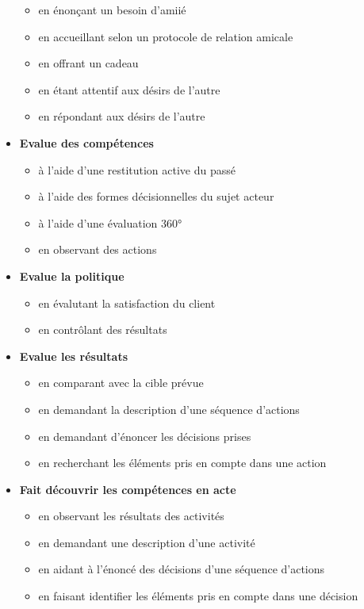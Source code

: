 \documentclass[8pt,a4paper]{article}
\begin{document}
\begin{itemize}
\begin{itemize}
\item en énonçant un besoin d'amiié  
\item en accueillant selon un protocole de relation amicale
\item en offrant un cadeau
\item en étant attentif aux désirs de l'autre
\item en répondant aux désirs de l'autre
\\ 
 \end{itemize}
\item \textbf{Evalue des compétences}
\begin{itemize}
\item à l'aide d'une restitution active du passé
\item à l'aide des formes décisionnelles du sujet acteur
\item à l'aide d'une évaluation 360°
\item en observant des actions
\\ 
 \end{itemize}
\item \textbf{Evalue la politique}
\begin{itemize}
\item en évalutant la satisfaction du client
\item en contrôlant des résultats
\\ 
 \end{itemize}
\item \textbf{Evalue les résultats}
\begin{itemize}
\item en comparant avec la cible prévue
\item en demandant la description d'une séquence d'actions
\item en demandant d'énoncer les décisions prises  
\item en recherchant les éléments pris en compte dans une action
\\ 
 \end{itemize}
\item \textbf{Fait découvrir les compétences en acte}
\begin{itemize}
\item en observant les résultats des activités
\item en demandant une description d'une activité
\item en aidant à l'énoncé des décisions d'une séquence d'actions
\item en faisant identifier les éléments pris en compte dans une décision

\end{itemize}
\end{itemize}
\end{document}
